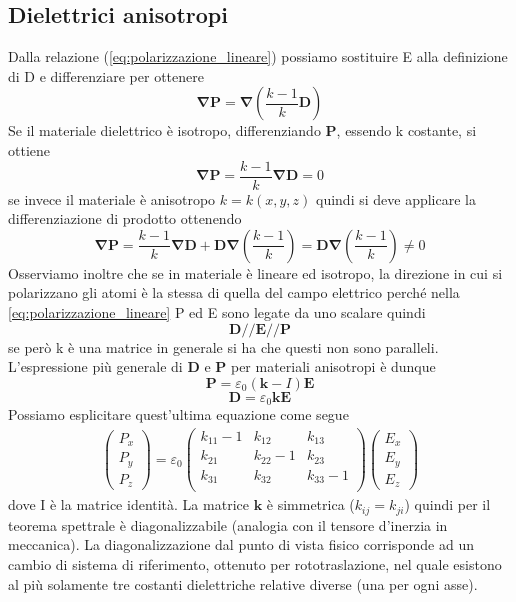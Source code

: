 \documentclass[10pt,a4paper]{article}
\begin{document}
\subsection{Dielettrici anisotropi}
Dalla relazione (\ref{eq:polarizzazione_lineare}) possiamo sostituire E alla definizione di D e differenziare per ottenere
\[\mathbf{\nabla}\mathbf{P} = \mathbf{\nabla}\left(\frac{k-1}{k}\mathbf{D}\right)\]
Se il materiale dielettrico è isotropo, differenziando $\mathbf{P}$, essendo k costante, si ottiene 
\[\mathbf{\nabla}\mathbf{P} = \frac{k-1}{k}\mathbf{\nabla}\mathbf{D} = 0\] 
se invece il materiale è anisotropo \(k=k(x,y,z)\) quindi si deve applicare la differenziazione di prodotto ottenendo
\[\mathbf{\nabla}\mathbf{P} = \frac{k-1}{k}\mathbf{\nabla}\mathbf{D} + \mathbf{D}\mathbf{\nabla}\left(\frac{k-1}{k}\right)= \mathbf{D}\mathbf{\nabla}\left(\frac{k-1}{k}\right)\neq 0\]
Osserviamo inoltre che se in materiale è lineare ed isotropo, la direzione in cui si polarizzano gli atomi è la stessa di quella del campo elettrico perché nella \ref{eq:polarizzazione_lineare} P ed E sono legate da uno scalare quindi
\[\mathbf{D}//\mathbf{E}//\mathbf{P}\]
se però k è una matrice in generale si ha che questi non sono paralleli. L'espressione più generale di $\mathbf{D}$ e $\mathbf{P}$ per materiali anisotropi è dunque
\[\mathbf{P} = \varepsilon_0 (\mathbf{k}-I)\mathbf{E}\]
\[\mathbf{D} = \varepsilon_0\mathbf{k}\mathbf{E}\]
Possiamo esplicitare quest'ultima equazione come segue
\begin{align*}
	\begin{pmatrix}
	P_x\\
	P_y\\
	P_z
	\end{pmatrix}
=\varepsilon_0
	\begin{pmatrix}
		k_{11}-1&k_{12}&k_{13}\\
		k_{21}&k_{22}-1&k_{23}\\
		k_{31}&k_{32}&k_{33}-1\\
	\end{pmatrix}
	\begin{pmatrix}
		E_x\\
		E_y\\
		E_z
	\end{pmatrix}
\end{align*}
dove I è la matrice identità. La matrice $\mathbf{k}$ è simmetrica (\(k_{ij} = k_{ji}\)) quindi per il teorema spettrale è diagonalizzabile (analogia con il tensore d'inerzia in meccanica). La diagonalizzazione dal punto di vista fisico corrisponde ad un cambio di sistema di riferimento, ottenuto per rototraslazione, nel quale esistono al più solamente tre costanti dielettriche relative diverse (una per ogni asse).
\end{document}
